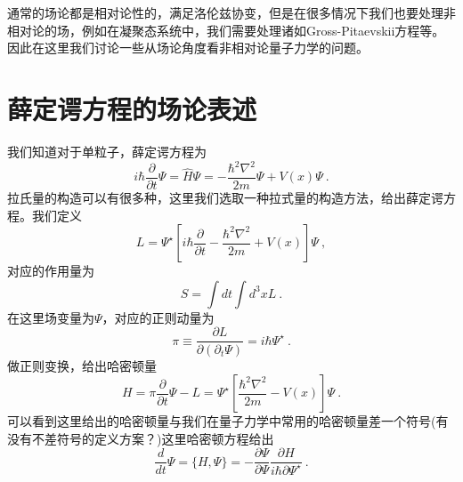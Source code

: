 
通常的场论都是相对论性的，满足洛伦兹协变，但是在很多情况下我们也要处理非相对论的场，例如在凝聚态系统中，我们需要处理诸如Gross-Pitaevskii方程等。因此在这里我们讨论一些从场论角度看非相对论量子力学的问题。
\section{薛定谔方程的场论表述}
我们知道对于单粒子，薛定谔方程为
\begin{equation}
i\hbar \frac{\partial}{\partial t} \Psi = \hat{H} \Psi = -\frac{\hbar^2 \nabla^2}{2m} \Psi + V(x)\Psi ~.
\end{equation}
拉氏量的构造可以有很多种，这里我们选取一种拉式量的构造方法，给出薛定谔方程。我们定义
$$
L =  \Psi^\star [i\hbar \frac{\partial}{\partial t} -\frac{\hbar^2 \nabla^2}{2m} + V(x)]\Psi~,
$$
对应的作用量为
$$
S = \int dt \int d^3 x L~.
$$
在这里场变量为$\Psi$，对应的正则动量为
$$
\pi \equiv \frac{\partial L}{\partial (\partial_t \Psi)} = i\hbar \Psi^\star~.
$$
做正则变换，给出哈密顿量
$$
H = \pi \frac{\partial}{\partial t}\Psi - L = \Psi^\star [\frac{\hbar^2 \nabla^2}{2m}- V(x)]\Psi~.
$$
可以看到这里给出的哈密顿量与我们在量子力学中常用的哈密顿量差一个符号(有没有不差符号的定义方案？)这里哈密顿方程给出
$$
\frac{d}{d t}\Psi = \{H,\Psi\} = -\frac{\partial \Psi}{\partial \Psi}\frac{\partial H}{i\hbar \partial \Psi^\star}~.
$$
